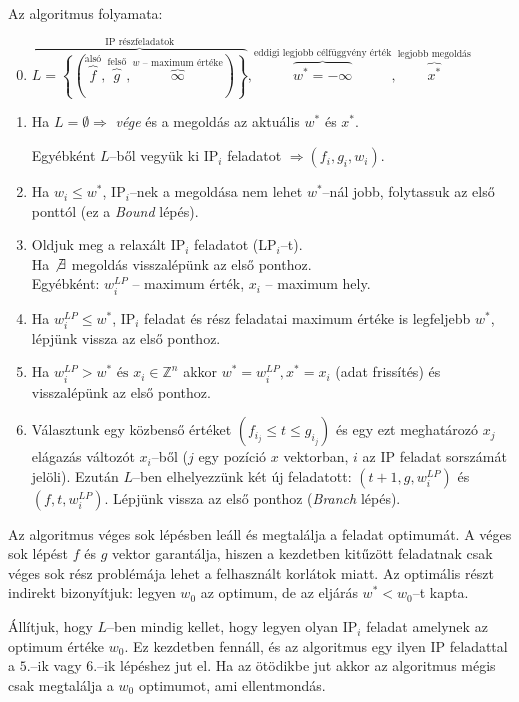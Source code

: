 Az algoritmus folyamata:

\begin{enumerate}
  \setcounter{enumi}{-1}
  \item $\overbrace{L=\left\{ \left(
  \overbrace{f}^{\text{alsó}},\overbrace{g}^{\text{felső}},\overbrace{\infty}^{w
  \text{ -- maximum értéke}} \right) \right\}}^{\text{IP részfeladatok}},
  \overbrace{w^*=-\infty}^{\text{eddigi legjobb célfüggvény érték}},
  \overbrace{x^*}^{\text{legjobb megoldás}}$
  \item Ha $L=\emptyset \Rightarrow$ \emph{vége} és a megoldás az aktuális $w^*$
  és $x^*$.
  
  Egyébként $L$--ből vegyük ki IP$_i$ feladatot $\Rightarrow (f_i, g_i, w_i)$.
  \item Ha $w_i \leq w^*$, IP$_i$--nek a megoldása nem lehet $w^*$--nál jobb,
  folytassuk az első ponttól (ez a \emph{Bound} lépés).
  \item Oldjuk meg a relaxált IP$_i$ feladatot (LP$_i$--t).
  \\ Ha $\not \exists$ megoldás visszalépünk az első ponthoz.
  \\ Egyébként: $w^{LP}_{i}$ -- maximum érték,  $x_i$ -- maximum hely.
  \item Ha $w^{LP}_{i} \leq w^*$, IP$_i$ feladat és rész feladatai maximum értéke is
  legfeljebb $w^*$, lépjünk vissza az első ponthoz.
  \item Ha $w^{LP}_{i} > w^* \mbox{ és } x_i \in \mathbb{Z}^{n}$ akkor $ w^* = w^{LP}_{i}, x^* =
  x_i$ (adat frissítés) és visszalépünk az első ponthoz.
  \item Választunk egy közbenső értéket $(f_{i_j} \leq t \leq g_{i_j})$ és egy
  ezt meghatározó $x_j$ elágazás változót $x_i$--ből ($j$ egy pozíció $x$
  vektorban, $i$ az IP feladat sorszámát jelöli). Ezután $L$--ben elhelyezzünk
  két új feladatott:  $(t+1, g, w^{LP}_{i})$ és $(f, t, w^{LP}_{i})$. Lépjünk vissza az első
  ponthoz (\emph{Branch} lépés).
\end{enumerate} 

Az algoritmus véges sok lépésben leáll és megtalálja a feladat optimumát. A
véges sok lépést $f$ és $g$ vektor garantálja, hiszen a kezdetben kitűzött
feladatnak csak véges sok rész problémája lehet a felhasznált korlátok miatt. Az
optimális részt indirekt bizonyítjuk: legyen $w_0$ az optimum, de az eljárás
$w^*<w_0$--t kapta.

Állítjuk, hogy $L$--ben mindig kellet, hogy legyen olyan IP$_i$ feladat amelynek
az optimum értéke $w_0$. Ez kezdetben fennáll, és az algoritmus egy ilyen IP
feladattal a $5.$--ik vagy $6.$--ik lépéshez jut el. Ha az ötödikbe jut akkor az
algoritmus mégis csak megtalálja a $w_0$ optimumot, ami ellentmondás.

